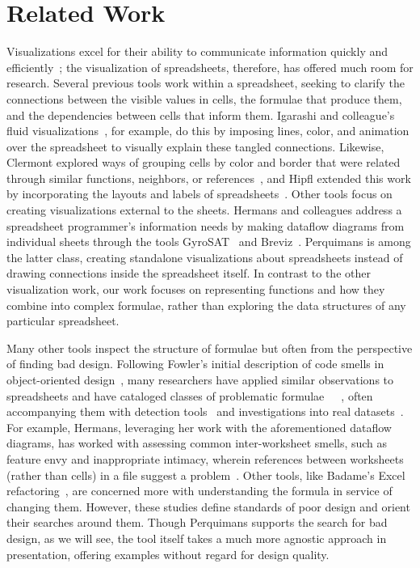\documentclass[conference]{IEEEtran}
\newcommand{\toolname}{Perquimans } \newcommand{\toolnameend}{Perquimans}
\begin{document}
	\section{Related Work} \label{related-work} Visualizations excel for their
	ability to communicate information quickly and
	efficiently~\cite{baeza1999modern}; the visualization of spreadsheets,
	therefore, has offered much room for research. Several previous tools work
	within a spreadsheet, seeking to clarify the connections between the visible
	values in cells, the formulae that produce them, and the dependencies between
	cells that inform them. Igarashi and colleague's fluid
	visualizations~\cite{igarashi1998fluid}, for example, do this by imposing
	lines, color, and animation over the spreadsheet to visually explain these
	tangled connections. Likewise, Clermont explored ways of grouping cells by
	color and border that were related through similar functions, neighbors, or
	references~\cite{clermont2003scalable}, and Hipfl extended this work by
	incorporating the layouts and labels of spreadsheets~\cite{hipfl2008using}.
	Other tools focus on creating visualizations external to the sheets. Hermans
	and colleagues address a spreadsheet programmer's information needs by making
	dataflow diagrams from individual sheets through the tools
	GyroSAT~\cite{hermans2011supporting} and Breviz~\cite{hermans2011breviz}.
	\toolname is among the latter class, creating standalone visualizations about
	spreadsheets instead of drawing connections inside the spreadsheet itself. In
	contrast to the other visualization work, our work focuses on representing
	functions and how they combine into complex formulae, rather than exploring the
	data structures of any particular spreadsheet.  \par
	
	Many other tools inspect the structure of formulae but often from the
	perspective of finding bad design.  Following Fowler's initial description of
	code smells in object-oriented design~\cite{fowler2009refactoring}, many
	researchers have applied similar observations to spreadsheets and have
	cataloged classes of problematic
	formulae~\cite{hermans2012detecting}~\cite{cunha2012towards}~\cite{asavametha2012detecting}, often accompanying them with detection tools~\cite{abreu2014smelling} and investigations into real datasets~\cite{jansen2015code}. For example, Hermans, leveraging her work with the aforementioned dataflow diagrams, has worked with assessing common inter-worksheet smells, such as feature envy and inappropriate intimacy, wherein references between worksheets (rather than cells) in a file suggest a problem~\cite{hermans2012detectinginter}. Other tools, like Badame's Excel refactoring~\cite{badame2012refactoring}, are concerned more with understanding the formula in service of changing them. However, these studies define standards of poor design and orient their searches around them. Though \toolname supports the search for bad design, as we will see, the tool itself takes a much more agnostic approach in presentation, offering examples without regard for design quality. \par
	
\end{document}

